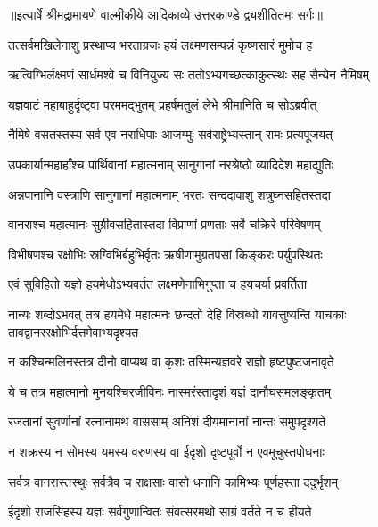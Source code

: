 {॥इत्यार्षे श्रीमद्रामायणे वाल्मीकीये आदिकाव्ये उत्तरकाण्डे द्व्यशीतितमः सर्गः॥}


\twolineshloka
{तत्सर्वमखिलेनाशु प्रस्थाप्य भरताग्रजः}
{हयं लक्ष्मणसम्पन्नं कृष्णसारं मुमोच ह} %

\twolineshloka
{ऋत्विग्भिर्लक्ष्मणं सार्धमश्वे च विनियुज्य सः}
{ततोऽभ्यगच्छत्काकुत्स्थः सह सैन्येन नैमिषम्} %

\twolineshloka
{यज्ञवाटं महाबाहुर्दृष्ट्वा परममद्भुतम्}
{प्रहर्षमतुलं लेभे श्रीमानिति च सोऽब्रवीत्} %

\twolineshloka
{नैमिषे वसतस्तस्य सर्व एव नराधिपाः}
{आजग्मुः सर्वराष्ट्रेभ्यस्तान् रामः प्रत्यपूजयत्} %

\twolineshloka
{उपकार्यान्महार्हांश्च पार्थिवानां महात्मनाम्}
{सानुगानां नरश्रेष्ठो व्यादिदेश महाद्युतिः} %

\twolineshloka
{अन्नपानानि वस्त्राणि सानुगानां महात्मनाम्}
{भरतः सन्ददावाशु शत्रुघ्नसहितस्तदा} %

\twolineshloka
{वानराश्च महात्मानः सुग्रीवसहितास्तदा}
{विप्राणां प्रणताः सर्वे चक्रिरे परिवेषणम्} %

\twolineshloka
{विभीषणश्च रक्षोभिः स्रग्विभिर्बहुभिर्वृतः}
{ऋषीणामुग्रतपसां किङ्करः पर्युपस्थितः} %

\twolineshloka
{एवं सुविहितो यज्ञो हयमेधोऽभ्यवर्तत}
{लक्ष्मणेनाभिगुप्ता च हयचर्या प्रवर्तिता} %

\threelineshloka
{नान्यः शब्दोऽभवत् तत्र हयमेधे महात्मनः}
{छन्दतो देहि विस्रब्धो यावत्तुष्यन्ति याचकाः}
{तावद्वानररक्षोभिर्दत्तमेवाभ्यदृश्यत} %

\twolineshloka
{न कश्चिन्मलिनस्तत्र दीनो वाप्यथ वा कृशः}
{तस्मिन्यज्ञवरे राज्ञो हृष्टपुष्टजनावृते} %

\twolineshloka
{ये च तत्र महात्मानो मुनयश्चिरजीविनः}
{नास्मरंस्तादृशं यज्ञं दानौघसमलङ्कृतम्} %

\twolineshloka
{रजतानां सुवर्णानां रत्नानामथ वाससाम्}
{अनिशं दीयमानानां नान्तः समुपदृश्यते} %

\twolineshloka
{न शक्रस्य न सोमस्य यमस्य वरुणस्य वा}
{ईदृशो दृष्टपूर्वो न एवमूचुस्तपोधनाः} %

\twolineshloka
{सर्वत्र वानरास्तस्थुः सर्वत्रैव च राक्षसाः}
{वासो धनानि कामिभ्यः पूर्णहस्ता ददुर्भृशम्} %

\twolineshloka
{ईदृशो राजसिंहस्य यज्ञः सर्वगुणान्वितः}
{संवत्सरमथो साग्रं वर्तते न च हीयते} %


